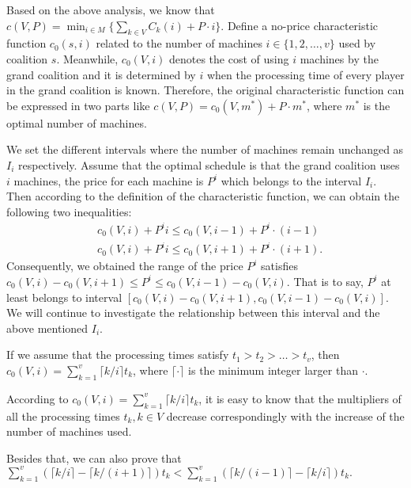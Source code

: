 Based on the above analysis, we know that $c(V,P) = \min_{i \in M} \{\sum_{k\in V}{C_k(i)}+ P\cdot i\}.$ Define a no-price characteristic function $c_0(s,i)$
related to the number of machines $i \in \{1,2,\ldots,v\}$ used by coalition $s.$ Meanwhile, $c_0(V,i)$ denotes the cost of using $i$ machines by the grand coalition and it is determined by $i$ when the processing time of every player in the grand coalition is known.
Therefore, the original characteristic function can be expressed in two parts like $c(V,P) = c_0(V,m^*) + P\cdot m^*$, where $m^*$ is the optimal number of machines.

We set the different intervals where the number of machines remain unchanged as $I_i$ respectively.
Assume that the optimal schedule is that the grand coalition uses $i$ machines, the price for each machine is $P^i$ which belongs to the interval $I_i$.
Then according to the definition of the characteristic function, we can obtain the following two inequalities:
\[
\begin{aligned}
&c_0 (V,i) + P^i i \leq c_0 (V,i-1) + P^i\cdot(i-1) \\
&c_0 (V,i) + P^i i \leq c_0 (V,i+1) + P^i\cdot(i+1).
\end{aligned}
\]
Consequently, we obtained the range of the price $P^i$ satisfies $c_0 (V,i) - c_0 (V,i+1) \leq P^i \leq c_0 (V,i-1) - c_0 (V,i)$.
That is to say, $P^i$ at least belongs to interval $[c_0 (V,i) - c_0 (V,i+1), c_0 (V,i-1) - c_0 (V,i)].$
We will continue to investigate the relationship between this interval and the above mentioned $I_i$.


If we assume that the processing times satisfy $t_1 > t_2 > \ldots > t_v$, then $c_0(V,i) = \sum_{k=1}^{v} {\lceil k/i \rceil} t_{k}$, where $\lceil \cdot \rceil$ is the minimum integer larger than $\cdot$.

According to $c_0(V,i) = \sum_{k=1}^{v} {\lceil k/i \rceil} t_{k}$, it is easy to know that the multipliers of all the processing times $t_k, k \in V$ decrease correspondingly with the increase of the number of machines used.

Besides that, we can also prove that $\sum_{k=1}^{v} ({\lceil k/i \rceil} - {\lceil k/(i+1) \rceil}) t_k < \sum_{k=1}^{v} ({\lceil k/(i-1) \rceil} - {\lceil k/i \rceil}) t_k.$

